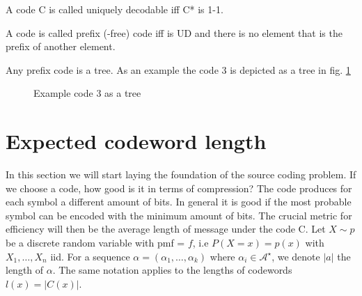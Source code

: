 \begin{definition}
	A code C is called uniquely decodable iff C* is 1-1.
\end{definition}

\begin{definition}
	A code is called prefix (-free) code iff is UD and there is no element that is the prefix of another element. 
\end{definition}

\begin{info}
	Any prefix code is a tree. As an example the code 3 is depicted as a tree in fig. \ref{fig:code3tree} \newline
\end{info}
\begin{figure}[h]
	\begin{center}
	\end{center}
	\caption{Example code 3 as a tree}
	\label{fig:code3tree}
\end{figure}


\section{Expected codeword length}
In this section we will start laying the foundation of the source coding problem. If we choose a code, how good is it in terms of compression? The code produces for each symbol a different amount of bits. In general it is good if the most probable symbol can be encoded with the minimum amount of bits. The crucial metric for efficiency will then be the average length of message under the code C. \newline\newline
Let $X \sim p$ be a discrete random variable with pmf = $f$, i.e $P(X=x) = p(x)$ with $X_1, \dots, X_n$ iid.
For a sequence $\alpha = (\alpha_1, \dots, \alpha_k)$ where $\alpha_i \in \mathcal{A}^\star$,  we denote $|a|$ the length of $\alpha$. The same notation applies to the lengths of codewords $l(x) = |C(x)|$.

